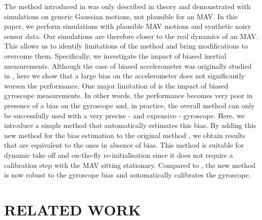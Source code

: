 \documentclass[letterpaper, 10 pt, journal, twoside]{IEEEtran}  %
\begin{document}
The method introduced in \cite{Martinelli2012, Martinelli2014} was only described in theory and demonstrated with simulations on generic Gaussian motions, not plausible for an MAV.
In this paper, we perform simulations with plausible MAV motions and synthetic noisy sensor data.
Our simulations are therefore closer to the real dynamics of an MAV.
This allows us to identify limitations of the method and bring modifications to overcome them.
Specifically, we investigate the impact of biased inertial measurements.
Although the case of biased accelerometer was originally studied in \cite{Martinelli2014}, here we show that a large bias on the accelerometer does not significantly worsen the performance.
One major limitation of \cite{Martinelli2014} is the impact of biased gyroscope measurements.
In other words, the performance becomes very poor in presence of a bias on the gyroscope and, in practice, the overall method can only be successfully used with a very precise - and expensive - gyroscope.
Here, we introduce a simple method that automatically estimates this bias. By adding this new method for the bias estimation to the original method \cite{Martinelli2014}, we obtain results that are equivalent to the ones in absence of bias.
This method is suitable for dynamic take off and on-the-fly re-initialisation since it does not require a calibration step with the MAV sitting stationary.
Compared to \cite{Martinelli2014}, the new method is now robust to the gyroscope bias and automatically calibrates the gyroscope.






\section{RELATED WORK}
\end{document}
